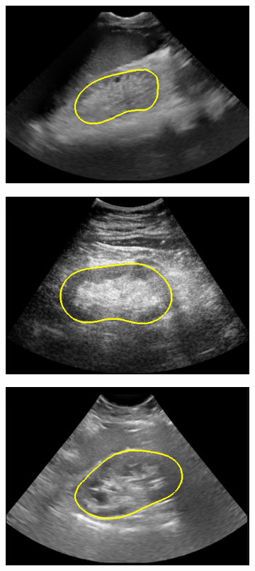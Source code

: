 \begin{figure}[htb]
\centering
\begin{subfigure}{.33\textwidth}
  \centering
  \includegraphics[width=.95\textwidth]{img_transfer/adult_bad}
\end{subfigure}%
\begin{subfigure}{.33\textwidth}
  \centering
  \includegraphics[width=.95\textwidth]{img_transfer/adult_less_bad}
\end{subfigure}
\begin{subfigure}{.33\textwidth}
  \centering
  \includegraphics[width=.95\textwidth]{img_transfer/child_less_bad}

\end{subfigure}
\end{figure}
